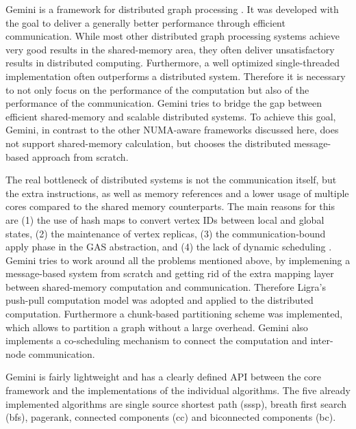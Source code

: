
Gemini is a framework for distributed graph processing \cite{Gemini}.
It was developed with the goal to deliver a generally better performance through efficient communication.
While most other distributed graph processing systems achieve very good results in the shared-memory area, they often deliver unsatisfactory results in distributed computing.
Furthermore, a well optimized single-threaded implementation often outperforms a distributed system.
Therefore it is necessary to not only focus on the performance of the computation but also of the performance of the communication.
Gemini tries to bridge the gap between efficient shared-memory and scalable distributed systems.
To achieve this goal, Gemini, in contrast to the other NUMA-aware frameworks discussed here, does not support shared-memory calculation, but chooses the distributed message-based approach from scratch.

The real bottleneck of distributed systems is not the communication itself, but the extra instructions, as well as memory references and a lower usage of multiple cores compared to the shared memory counterparts.
The main reasons for this are (1) the use of hash maps to convert vertex IDs between local and global states, (2) the maintenance of vertex replicas, (3) the communication-bound apply phase in the GAS abstraction, and (4) the lack of dynamic scheduling \cite{Gemini}.
Gemini tries to work around all the problems mentioned above, by implemening a message-based system from scratch and getting rid of the extra mapping layer between shared-memory computation and communication.
Therefore Ligra's push-pull computation model was adopted and applied to the distributed computation.
Furthermore a chunk-based partitioning scheme was implemented, which allows to partition a graph without a large overhead.
Gemini also implements a co-scheduling mechanism to connect the computation and inter-node communication.

Gemini is fairly lightweight and has a clearly defined API between the core framework and the implementations of the individual algorithms. The five already implemented algorithms are single source shortest path (sssp), breath first search (bfs), pagerank, connected components (cc) and biconnected components (bc).

